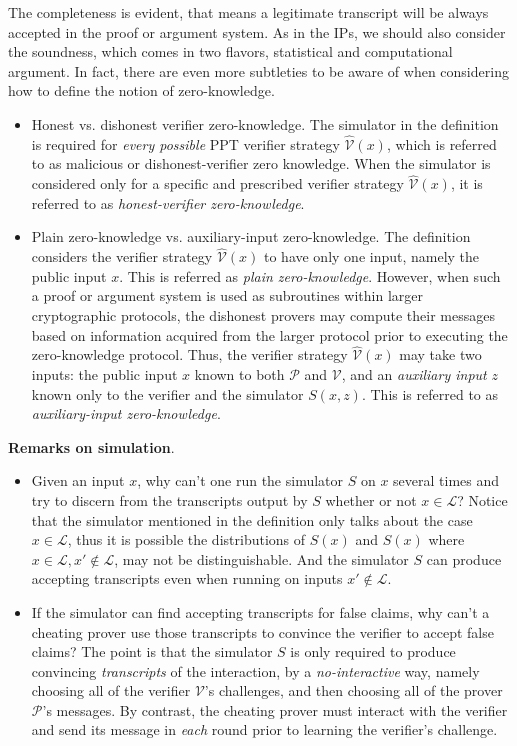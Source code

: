 \documentclass{article}
\begin{document}
The completeness is evident, that means a legitimate transcript will be always accepted in the proof or argument system. As in the IPs, we should also consider the soundness, which comes in two flavors, statistical and computational argument. In fact, there are even more subtleties to be aware of when considering how to define the notion of zero-knowledge.

\begin{itemize}
\item Honest vs. dishonest verifier zero-knowledge. The simulator in the definition is required for \textit{every possible} PPT verifier strategy $\hat{\mathcal{V}}(x)$, which is referred to as malicious or dishonest-verifier zero knowledge. When the simulator is considered only for a specific and prescribed verifier strategy $\hat{\mathcal{V}}(x)$, it is referred to as \textit{honest-verifier zero-knowledge}.

\item Plain zero-knowledge vs. auxiliary-input zero-knowledge. The definition considers the verifier strategy $\hat{\mathcal{V}}(x)$ to have only one input, namely the public input $x$. This is referred as \textit{plain zero-knowledge}. However, when such a proof or argument system is used as subroutines within larger cryptographic protocols, the dishonest provers may compute their messages based on information acquired from the larger protocol prior to executing the zero-knowledge protocol. Thus, the verifier strategy $\hat{\mathcal{V}}(x)$ may take two inputs: the public input $x$ known to both $\mathcal{P}$ and $\mathcal{V}$, and an \textit{auxiliary input} $z$ known only to the verifier and the simulator $S(x, z)$. This is referred to as \textit{auxiliary-input zero-knowledge}.  
\end{itemize}

\textbf{Remarks on simulation}. 

\begin{itemize}
\item Given an input $x$, why can't one run the simulator $S$ on $x$ several times and try to discern from the transcripts output by $S$ whether or not $x \in \mathcal{L}$? Notice that the simulator mentioned in the definition only talks about the case $x \in \mathcal{L}$, thus it is possible the distributions of $S(x)$ and $S(x)$ where $x \in \mathcal{L}, x' \notin \mathcal{L}$, may not be distinguishable. And the simulator $S$ can produce accepting transcripts even when running on inputs $x' \notin \mathcal{L}$. 
\item If the simulator can find accepting transcripts for false claims, why can't a cheating prover use those transcripts to convince the verifier to accept false claims? The point is that the simulator $S$ is only required to produce convincing \textit{transcripts} of the interaction, by a \textit{no-interactive} way, namely choosing all of the verifier $\mathcal{V}$'s challenges, and then choosing all of the prover $\mathcal{P}$'s messages. By contrast, the cheating prover must interact with the verifier and send its message in \textit{each} round prior to learning the verifier's challenge. 
\end{itemize}
\end{document}
